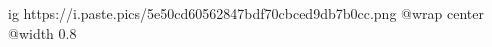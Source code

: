  
 
 
 
 

\ifcmt
  ig https://i.paste.pics/5e50cd60562847bdf70cbced9db7b0cc.png
  @wrap center
  @width 0.8
\fi
